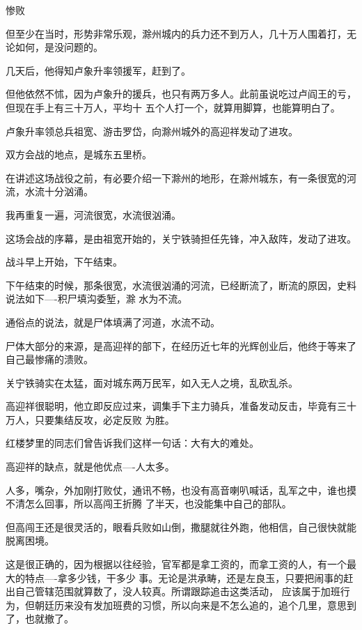 \documentclass[11pt,a4paper,onecolumn]{article}
\begin{document}
惨败

但至少在当时，形势非常乐观，滁州城内的兵力还不到万人，几十万人围着打，无论如何，是没问题的。

几天后，他得知卢象升率领援军，赶到了。

但他依然不怵，因为卢象升的援兵，也只有两万多人。此前虽说吃过卢阎王的亏，但现在手上有三十万人，平均十
五个人打一个，就算用脚算，也能算明白了。

卢象升率领总兵祖宽、游击罗岱，向滁州城外的高迎祥发动了进攻。

双方会战的地点，是城东五里桥。

在讲述这场战役之前，有必要介绍一下滁州的地形，在滁州城东，有一条很宽的河流，水流十分汹涌。

我再重复一遍，河流很宽，水流很汹涌。

这场会战的序幕，是由祖宽开始的，关宁铁骑担任先锋，冲入敌阵，发动了进攻。

战斗早上开始，下午结束。

下午结束的时候，那条很宽，水流很汹涌的河流，已经断流了，断流的原因，史料说法如下----积尸填沟委堑，滁
水为不流。

通俗点的说法，就是尸体填满了河道，水流不动。

尸体大部分的来源，是高迎祥的部下，在经历近七年的光辉创业后，他终于等来了自己最惨痛的溃败。

关宁铁骑实在太猛，面对城东两万民军，如入无人之境，乱砍乱杀。

高迎祥很聪明，他立即反应过来，调集手下主力骑兵，准备发动反击，毕竟有三十万人，只要集结反攻，必定反败
为胜。

红楼梦里的同志们曾告诉我们这样一句话：大有大的难处。

高迎祥的缺点，就是他优点----人太多。

人多，嘴杂，外加刚打败仗，通讯不畅，也没有高音喇叭喊话，乱军之中，谁也摸不清怎么回事，所以高闯王折腾
了半天，也没能集中自己的部队。

但高闯王还是很灵活的，眼看兵败如山倒，撒腿就往外跑，他相信，自己很快就能脱离困境。

这是很正确的，因为根据以往经验，官军都是拿工资的，而拿工资的人，有一个最大的特点----拿多少钱，干多少
事。无论是洪承畴，还是左良玉，只要把闹事的赶出自己管辖范围就算数了，没人较真。所谓跟踪追击这类活动，
应该属于加班行为，但朝廷历来没有发加班费的习惯，所以向来是不怎么追的，追个几里，意思到了，也就撤了。

\section[\thesection]{}
\end{document}
